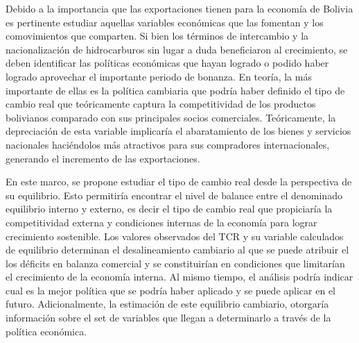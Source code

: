 \documentclass[12pt,letterpaper]{article}
\begin{document}
Debido a la importancia que las exportaciones tienen para la economía de Bolivia es pertinente estudiar aquellas variables económicas que las fomentan y los comovimientos que comparten. Si bien los términos de intercambio y la nacionalización de hidrocarburos sin lugar a duda beneficiaron al crecimiento, se deben identificar las políticas económicas que hayan logrado o podido haber logrado aprovechar el importante periodo de bonanza. En teoría, la más importante de ellas es la política cambiaria que podría haber definido el tipo de cambio real que teóricamente captura la competitividad de los productos bolivianos comparado con sus principales socios comerciales. Teóricamente, la depreciación de esta variable implicaría el abaratamiento de los bienes y servicios nacionales haciéndolos más atractivos para sus compradores internacionales, generando el incremento de las exportaciones.


En este marco, se propone estudiar el tipo de cambio real desde la perspectiva de su equilibrio. Esto permitiría encontrar el nivel de balance entre el denominado equilibrio interno y externo, es decir el tipo de cambio real que propiciaría la competitividad externa y condiciones internas de la economía para lograr crecimiento sostenible. Los valores observados del TCR y su variable calculados de equilibrio determinan el desalineamiento cambiario al que se puede atribuir el los déficits en balanza comercial y se constituirían en condiciones que limitarían el crecimiento de la economía interna. Al mismo tiempo, el análisis podría indicar cual es la mejor política que se podría haber aplicado y se puede aplicar en el futuro. Adicionalmente, la estimación de este equilibrio cambiario, otorgaría información sobre el set de variables que llegan a determinarlo a través de la política económica.
\end{document}
